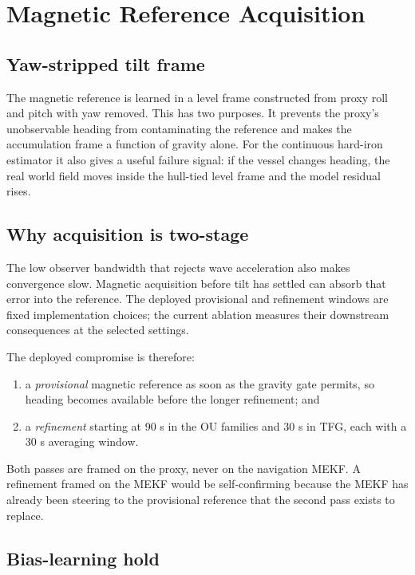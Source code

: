 \documentclass[conference]{IEEEtran}
\begin{document}
\section{Magnetic Reference Acquisition}
\label{sec:mag-acq}

\subsection{Yaw-stripped tilt frame}

The magnetic reference is learned in a level frame constructed from proxy roll and
pitch with yaw removed.  This has two purposes.  It prevents the proxy's unobservable
heading from contaminating the reference and makes the accumulation frame a function
of gravity alone.  For the continuous hard-iron estimator it also gives a useful
failure signal: if the vessel changes heading, the real world field moves inside the
hull-tied level frame and the model residual rises.

\subsection{Why acquisition is two-stage}

The low observer bandwidth that rejects wave acceleration also makes convergence slow.
Magnetic acquisition before tilt has settled can absorb that error into
the reference. The deployed provisional and refinement windows are fixed
implementation choices; the current ablation measures their downstream
consequences at the selected settings.

The deployed compromise is therefore:
\begin{enumerate}
  \item a \emph{provisional} magnetic reference as soon as the gravity gate permits,
        so heading becomes available before the longer refinement; and
  \item a \emph{refinement} starting at 90 s in the OU families and 30 s in TFG,
        each with a 30 s averaging window.
\end{enumerate}
Both passes are framed on the proxy, never on the navigation MEKF.  A refinement
framed on the MEKF would be self-confirming because the MEKF has already been steering
to the provisional reference that the second pass exists to replace.

\subsection{Bias-learning hold}
\end{document}
